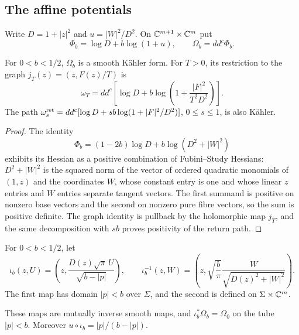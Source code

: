 \subsection{The affine potentials}\label{sec:vtr-bundle}

Write $D=1+|z|^2$ and $u=|W|^2/D^2$. On $\mathbb{C}^{m+1}\times\mathbb{C}^m$ put
\[
 \Phi_b=\log D+b\log(1+u),\qquad \Omega_b=dd^c\Phi_b.
\]

\begin{lemma}\label{lem:vtr-form}
For $0<b<1/2$, $\Omega_b$ is a smooth Kähler form. For $T>0$, its restriction to the graph $j_T(z)=(z,F(z)/T)$ is
\[
 \omega_T=dd^c\!\left[\log D+b\log\left(1+\frac{|F|^2}{T^2D^2}\right)\right].
\]
The path $\omega_s^{\rm ret}=dd^c[\log D+sb\log(1+|F|^2/D^2)]$, $0\le s\le1$, is also Kähler.
\end{lemma}

\begin{proof}
The identity
\[
 \Phi_b=(1-2b)\log D+b\log(D^2+|W|^2)
\]
exhibits its Hessian as a positive combination of Fubini--Study Hessians: $D^2+|W|^2$ is the squared norm of the vector of ordered
quadratic monomials of $(1,z)$ and the coordinates $W$, whose constant entry is one and whose linear $z$ entries and $W$ entries
separate tangent vectors. The first summand is positive on nonzero base vectors and the second on nonzero pure fibre vectors, so the
sum is positive definite. The graph identity is pullback by the holomorphic map $j_T$, and the same decomposition with $sb$ proves
positivity of the return path.
\end{proof}

\begin{construction}\label{cons:vtr-injection}
For $0<b<1/2$, let
\[
 \iota_b(z,U)=\left(z,\frac{D(z)\sqrt\pi\,U}{\sqrt{b-|p|}}\right),\qquad
 \iota_b^{-1}(z,W)=\left(z,\sqrt{\frac b\pi}\frac{W}{\sqrt{D(z)^2+|W|^2}}\right).
\]
The first map has domain $|p|<b$ over $\Sigma$, and the second is defined on $\Sigma\times\mathbb{C}^m$.
\end{construction}

\begin{lemma}\label{lem:vtr-injection}
These maps are mutually inverse smooth maps, and $\iota_b^*\Omega_b=\Omega_0$ on the tube $|p|<b$. Moreover
$u\circ\iota_b=|p|/(b-|p|)$.
\end{lemma}


